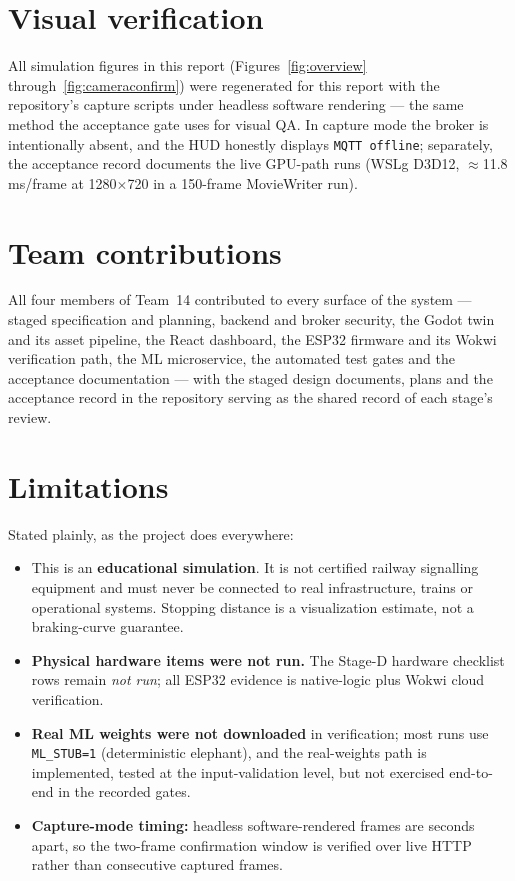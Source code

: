 \section{Visual verification}

All simulation figures in this report (Figures~\ref{fig:overview}
through~\ref{fig:cameraconfirm}) were regenerated for this report with the
repository's capture scripts under headless software rendering ---
the same method the acceptance gate uses for visual QA. In capture mode
the broker is intentionally absent, and the HUD honestly displays
\texttt{MQTT offline}; separately, the acceptance record documents the
live GPU-path runs (WSLg D3D12, $\approx$11.8\,ms/frame at 1280$\times$720
in a 150-frame MovieWriter run).

\section{Team contributions}

All four members of Team~14 contributed to every surface of the system ---
staged specification and planning, backend and broker security, the Godot
twin and its asset pipeline, the React dashboard, the ESP32 firmware and
its Wokwi verification path, the ML microservice, the automated test gates
and the acceptance documentation --- with the staged design documents,
plans and the acceptance record in the repository serving as the shared
record of each stage's review.

\section{Limitations}

Stated plainly, as the project does everywhere:

\begin{itemize}
  \item This is an \textbf{educational simulation}. It is not certified
        railway signalling equipment and must never be connected to real
        infrastructure, trains or operational systems. Stopping distance
        is a visualization estimate, not a braking-curve guarantee.
  \item \textbf{Physical hardware items were not run.} The Stage-D
        hardware checklist rows remain \emph{not run}; all ESP32 evidence
        is native-logic plus Wokwi cloud verification.
  \item \textbf{Real ML weights were not downloaded} in verification;
        most runs use \texttt{ML\_STUB=1} (deterministic elephant),
        and the real-weights path is implemented, tested at the
        input-validation level, but not exercised end-to-end in the
        recorded gates.
  \item \textbf{Capture-mode timing:} headless software-rendered frames
        are seconds apart, so the two-frame confirmation window is
        verified over live HTTP rather than consecutive captured frames.
\end{itemize}


